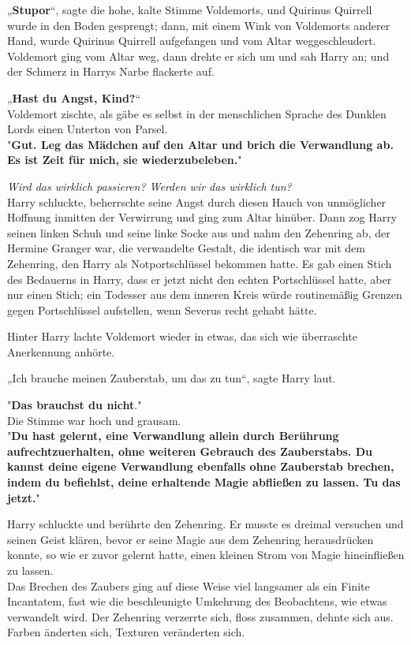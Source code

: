 {„\textbf{Stupor}“, sagte die hohe, kalte Stimme Voldemorts, und Quirinus Quirrell wurde in den Boden gesprengt; dann, mit einem Wink von Voldemorts anderer Hand, wurde Quirinus Quirrell aufgefangen und vom Altar weggeschleudert. Voldemort ging vom Altar weg, dann drehte er sich um und sah Harry an; und der Schmerz in Harrys Narbe flackerte auf.

„\textbf{Hast du Angst, Kind?}“\\ Voldemort zischte, als gäbe es selbst in der menschlichen Sprache des Dunklen Lords einen Unterton von Parsel.\\ "\textbf{Gut. Leg das Mädchen auf den Altar und brich die Verwandlung ab. Es ist Zeit für mich, sie wiederzubeleben.}"

\emph{Wird das wirklich passieren? Werden wir das wirklich tun?}\\ Harry schluckte, beherrschte seine Angst durch diesen Hauch von unmöglicher Hoffnung inmitten der Verwirrung und ging zum Altar hinüber. Dann zog Harry seinen linken Schuh und seine linke Socke aus und nahm den Zehenring ab, der Hermine Granger war, die verwandelte Gestalt, die identisch war mit dem Zehenring, den Harry als Notportschlüssel bekommen hatte. Es gab einen Stich des Bedauerns in Harry, dass er jetzt nicht den echten Portschlüssel hatte, aber nur einen Stich; ein Todesser aus dem inneren Kreis würde routinemäßig Grenzen gegen Portschlüssel aufstellen, wenn Severus recht gehabt hätte.

Hinter Harry lachte Voldemort wieder in etwas, das sich wie überraschte Anerkennung anhörte.

„Ich brauche meinen Zauberstab, um das zu tun“, sagte Harry laut.

"\textbf{Das brauchst du nicht}."\\ Die Stimme war hoch und grausam.\\ "\textbf{Du hast gelernt, eine Verwandlung allein durch Berührung aufrechtzuerhalten, ohne weiteren Gebrauch des Zauberstabs. Du kannst deine eigene Verwandlung ebenfalls ohne Zauberstab brechen, indem du befiehlst, deine erhaltende Magie abfließen zu lassen. Tu das jetzt.}"

Harry schluckte und berührte den Zehenring. Er musste es dreimal versuchen und seinen Geist klären, bevor er seine Magie aus dem Zehenring herausdrücken konnte, so wie er zuvor gelernt hatte, einen kleinen Strom von Magie hineinfließen zu lassen.\\ Das Brechen des Zaubers ging auf diese Weise viel langsamer als ein Finite Incantatem, fast wie die beschleunigte Umkehrung des Beobachtens, wie etwas verwandelt wird. Der Zehenring verzerrte sich, floss zusammen, dehnte sich aus. Farben änderten sich, Texturen veränderten sich.

}
